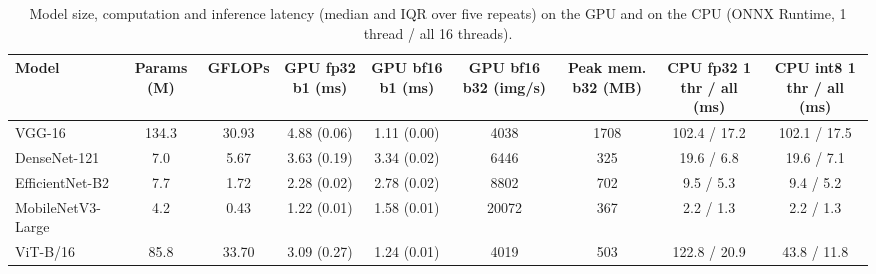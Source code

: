 \begin{table}[!tbp]
\centering
\caption{Model size, computation and inference latency (median and IQR over five repeats) on the GPU and on the CPU (ONNX Runtime, 1 thread / all 16 threads).}
\label{tab:efficiency}
\footnotesize
\begin{tabular}{lcccccccc}
\hline
Model & Params (M) & GFLOPs & GPU fp32 b1 (ms) & GPU bf16 b1 (ms) & GPU bf16 b32 (img/s) & Peak mem. b32 (MB) & CPU fp32 1 thr / all (ms) & CPU int8 1 thr / all (ms) \\
\hline
VGG-16 & 134.3 & 30.93 & 4.88 (0.06) & 1.11 (0.00) & 4038 & 1708 & 102.4 / 17.2 & 102.1 / 17.5 \\
DenseNet-121 & 7.0 & 5.67 & 3.63 (0.19) & 3.34 (0.02) & 6446 & 325 & 19.6 / 6.8 & 19.6 / 7.1 \\
EfficientNet-B2 & 7.7 & 1.72 & 2.28 (0.02) & 2.78 (0.02) & 8802 & 702 & 9.5 / 5.3 & 9.4 / 5.2 \\
MobileNetV3-Large & 4.2 & 0.43 & 1.22 (0.01) & 1.58 (0.01) & 20072 & 367 & 2.2 / 1.3 & 2.2 / 1.3 \\
ViT-B/16 & 85.8 & 33.70 & 3.09 (0.27) & 1.24 (0.01) & 4019 & 503 & 122.8 / 20.9 & 43.8 / 11.8 \\
\hline
\end{tabular}
\end{table}